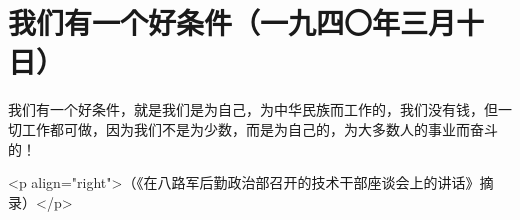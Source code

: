 \section[我们有一个好条件（一九四〇年三月十日）]{我们有一个好条件（一九四〇年三月十日）}


我们有一个好条件，就是我们是为自己，为中华民族而工作的，我们没有钱，但一切工作都可做，因为我们不是为少数，而是为自己的，为大多数人的事业而奋斗的！

<p align="right">（《在八路军后勤政治部召开的技术干部座谈会上的讲话》摘录）</p>

